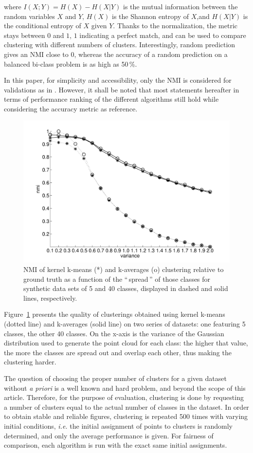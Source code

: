 \documentclass[twoside,11pt]{article}
\newcommand{\gl}[1]{``\,#1\,''} %
\begin{document}
where $I(X;Y)=H(X)−H(X|Y)$ is the mutual information between the random variables $X$ and $Y$, $H(X)$ is the Shannon entropy of $X$,and $H(X|Y)$ is the conditional entropy of $X$ given $Y$. Thanks to the normalization, the metric stays between $0$ and $1$, $1$ indicating a perfect match, and can be used to compare clustering with different numbers of clusters. Interestingly, random prediction gives an NMI close to $0$, whereas the accuracy of a random prediction on a balanced bi-class problem is as high as 50\,\%.

In this paper, for simplicity and accessibility, only the NMI is considered for validations as in \citep{Kulis2008}. However, it shall be noted that most statements hereafter in terms of performance ranking of the different algorithms still hold while considering the accuracy metric as reference.

\begin{figure}
\center
\includegraphics[width=.7\textwidth]{figures/synthetic.pdf} 
\caption{NMI of kernel k-means (*) and k-averages (o) clustering relative to ground truth as a function of the \gl{spread} of those classes for synthetic data sets of 5 and 40 classes, displayed in dashed and solid lines, respectively.}
\label{fig:synth_perf}
\end{figure}

Figure~\ref{fig:synth_perf} presents the quality of clusterings obtained using kernel k-means (dotted line) and k-averages (solid line) on two series of datasets: one featuring 5 classes, the other 40 classes. On the x-axis is the variance of the Gaussian distribution used to generate the point cloud for each class: the higher that value, the more the classes are spread out and overlap each other, thus making the clustering harder.

The question of choosing the proper number of clusters for a given dataset without \textit{a priori} is a well known and hard problem, and beyond the scope of this article. Therefore, for the purpose of evaluation, clustering is done by requesting a number of clusters equal to the actual number of classes in the dataset. In order to obtain stable and reliable figures, clustering is repeated 500 times with varying initial conditions, \textit{i.e.} the initial assignment of points to clusters is randomly determined, and only the average performance is given. For fairness of comparison, each algorithm is run with the exact same initial assignments.
\end{document}
